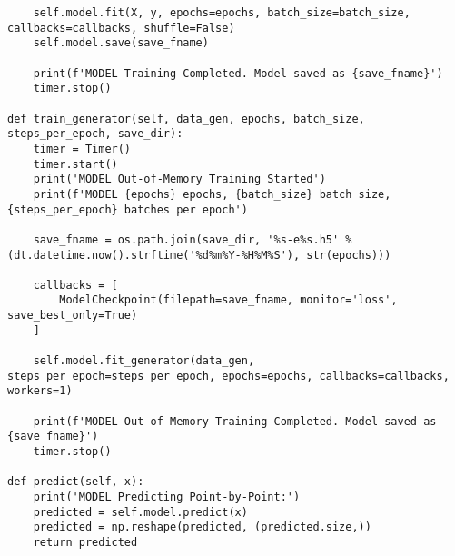 {\begin{lstlisting}
    self.model.fit(X, y, epochs=epochs, batch_size=batch_size, callbacks=callbacks, shuffle=False)
    self.model.save(save_fname)

    print(f'MODEL Training Completed. Model saved as {save_fname}')
    timer.stop()

def train_generator(self, data_gen, epochs, batch_size, steps_per_epoch, save_dir):
    timer = Timer()
    timer.start()
    print('MODEL Out-of-Memory Training Started')
    print(f'MODEL {epochs} epochs, {batch_size} batch size, {steps_per_epoch} batches per epoch')
    
    save_fname = os.path.join(save_dir, '%s-e%s.h5' % (dt.datetime.now().strftime('%d%m%Y-%H%M%S'), str(epochs)))
    
    callbacks = [
        ModelCheckpoint(filepath=save_fname, monitor='loss', save_best_only=True)
    ]
    
    self.model.fit_generator(data_gen, steps_per_epoch=steps_per_epoch, epochs=epochs, callbacks=callbacks, workers=1)
    
    print(f'MODEL Out-of-Memory Training Completed. Model saved as {save_fname}')
    timer.stop()

def predict(self, x):
    print('MODEL Predicting Point-by-Point:')
    predicted = self.model.predict(x)
    predicted = np.reshape(predicted, (predicted.size,))
    return predicted
\end{lstlisting}
}
